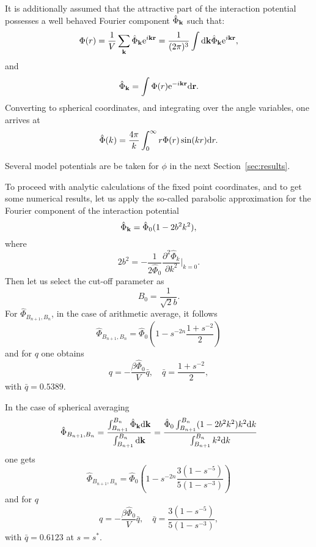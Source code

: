 It is additionally assumed that the attractive part of the interaction potential possesses a well behaved Fourier component $\hat{\Phi}_{\vb k}$ such that:
\begin{equation*}
	\Phi(r) = \frac{1}{V} \sum_{\vb k} \hat{\Phi}_{\vb k} {\rm e}^{i\vb k \vb r} = \frac{1}{(2\pi)^3} \int {\rm d} {\vb k} \hat{\Phi}_{\vb k} {\rm e}^{i\vb k \vb r},
\end{equation*}
and
\begin{equation}
	\label{def:fourier}
	\hat{\Phi}_{\vb k} = \int \Phi(r) {\rm e}^{-i\vb k \vb r} {\rm d} {\vb r}.
\end{equation}
Converting to spherical coordinates, and integrating over the angle variables, one arrives at
\begin{equation}
	\label{def:fourier_spherical}
	\hat{\Phi}(k) = \frac{4\pi}{k} \int_{0}^{\infty} r \Phi(r) \sin(k r) {\rm d} r.
\end{equation}

Several model potentials are be taken for $\phi$ in the next Section~\ref{sec:results}. 

To proceed with analytic calculations of the fixed point coordinates, and to get some numerical results, let us apply the so-called parabolic approximation for the Fourier component of the interaction potential
\begin{equation*}
	\hat{\Phi}_{\vb k} = \hat{\Phi}_0 (1 - 2b^2k^2),
\end{equation*}
where 
\begin{equation*}
	2b^2 = -\frac{1}{2\hat{\Phi}_0} \frac{\partial^2 \hat{\Phi}_k}{\partial k^2} \bigg|_{k=0}.
\end{equation*}
Then let us select the cut-off parameter as
$$
B_0 = \frac{1}{\sqrt{2} b}.
$$
For $\hat{\Phi}_{B_{n+1}, B_n}$, in the case of arithmetic average, it follows
\begin{equation*}
	\hat{\Phi}_{B_{n+1}, B_n} = \hat{\Phi}_0 \left(1 - s^{-2n} \frac{1 + s^{-2}}{2}\right)
\end{equation*}
and for $q$ one obtains
\begin{equation*}
	q = -\frac{\beta \hat{\Phi}_0}{V} \bar{q}, \quad \bar{q} = \frac{1 + s^{-2}}{2},
\end{equation*}
with $\bar{q} = 0.5389$.

In the case of spherical averaging
\begin{equation*}
	\hat{\Phi}_{B_{n+1}, B_n} = \frac{\int_{B_{n+1}}^{B_n} \hat{\Phi}_{\vb k} {\rm d} {\vb k}}
	{\int_{B_{n+1}}^{B_n} {\rm d} {\vb k}} 
	= \frac{\hat{\Phi}_0 \int_{B_{n+1}}^{B_n} (1 - 2b^2k^2) k^2 {\rm d} k}{\int_{B_{n+1}}^{B_n} k^2 {\rm d} k}
\end{equation*}
one gets
\begin{equation*}
	\hat{\Phi}_{B_{n+1}, B_n} = \hat{\Phi}_0 \left(1 - s^{-2n} \frac{3(1 - s^{-5})}{5(1 - s^{-3})}\right)
\end{equation*}
and for $q$
\begin{equation*}
	q = -\frac{\beta \hat{\Phi}_0}{V} \bar{q}, \quad \bar{q} = \frac{3(1 - s^{-5})}{5(1 - s^{-3})},
\end{equation*}
with $\bar{q} = 0.6123$ at $s = s^*$.
